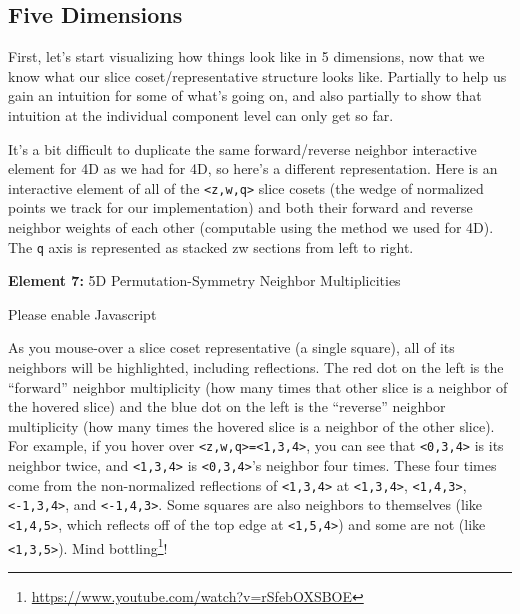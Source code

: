 \documentclass[]{article}
\renewcommand{\href}[2]{#2\footnote{\url{#1}}}
\begin{document}
\hypertarget{five-dimensions}{%
\subsection{Five Dimensions}\label{five-dimensions}}

First, let's start visualizing how things look like in 5 dimensions, now that we
know what our slice coset/representative structure looks like. Partially to help
us gain an intuition for some of what's going on, and also partially to show
that intuition at the individual component level can only get so far.

It's a bit difficult to duplicate the same forward/reverse neighbor interactive
element for 4D as we had for 4D, so here's a different representation. Here is
an interactive element of all of the \texttt{\textless{}z,w,q\textgreater{}}
slice cosets (the wedge of normalized points we track for our implementation)
and both their forward and reverse neighbor weights of each other (computable
using the method we used for 4D). The \texttt{q} axis is represented as stacked
zw sections from left to right.

\leavevmode\hypertarget{golSyms5D}{}%
\textbf{Element 7:} 5D Permutation-Symmetry Neighbor Multiplicities

\leavevmode\hypertarget{golSyms5DCont}{}%
Please enable Javascript

As you mouse-over a slice coset representative (a single square), all of its
neighbors will be highlighted, including reflections. The red dot on the left is
the ``forward'' neighbor multiplicity (how many times that other slice is a
neighbor of the hovered slice) and the blue dot on the left is the ``reverse''
neighbor multiplicity (how many times the hovered slice is a neighbor of the
other slice). For example, if you hover over
\texttt{\textless{}z,w,q\textgreater{}=\textless{}1,3,4\textgreater{}}, you can
see that \texttt{\textless{}0,3,4\textgreater{}} is its neighbor twice, and
\texttt{\textless{}1,3,4\textgreater{}} is
\texttt{\textless{}0,3,4\textgreater{}}'s neighbor four times. These four times
come from the non-normalized reflections of
\texttt{\textless{}1,3,4\textgreater{}} at
\texttt{\textless{}1,3,4\textgreater{}},
\texttt{\textless{}1,4,3\textgreater{}},
\texttt{\textless{}-1,3,4\textgreater{}}, and
\texttt{\textless{}-1,4,3\textgreater{}}. Some squares are also neighbors to
themselves (like \texttt{\textless{}1,4,5\textgreater{}}, which reflects off of
the top edge at \texttt{\textless{}1,5,4\textgreater{}}) and some are not (like
\texttt{\textless{}1,3,5\textgreater{}}).
\href{https://www.youtube.com/watch?v=rSfebOXSBOE}{Mind bottling}!
\end{document}
